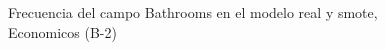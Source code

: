 \begin{figure}[H]
    \centering
    
    \caption{Frecuencia del campo Bathrooms en el modelo real y smote, Economicos (B-2)}
    \label{frecuency-Bathrooms-smote-enc}
\end{figure}